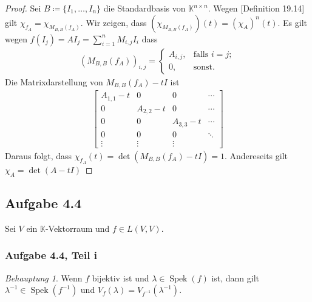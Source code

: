 \documentclass[draft,a5paper]{article}
\theoremstyle{remark}
\newtheorem*{beh}{Behauptung}
\DeclareMathOperator{\Spek}{Spek}
\begin{document}
\begin{proof}
  Sei \(B \coloneq \{I_{1}, \ldots, I_{n}\}\) die Standardbasis von
  \(\mathbb{K}^{n \times n}\).  Wegen [Definition 19.14] gilt
  \(\chi_{f_{A}} = \chi_{M_{B,B}(f_{A})}\).  Wir zeigen, dass
  \((\chi_{M_{B,B}(f_{A})})(t) = (\chi_{A})^{n}(t)\).  Es gilt wegen
  \(f(I_{j}) = AI_{j} = \sum_{i = 1}^{n}{M_{i,j}I_{i}}\) dass
  \begin{align*}
    (M_{B,B}(f_{A}))_{i, j} =
    \begin{cases}
      A_{i, j}, & \text{falls } i=j; \\
      0, & \text{sonst.}
    \end{cases}
  \end{align*}
  Die Matrixdarstellung von \(M_{B,B}(f_{A}) - tI\) ist
  \begin{align*}
    \begin{bmatrix}
      A_{1,1} - t & 0 & 0 & \cdots \\
      0 & A_{2,2} - t & 0 & \cdots \\
      0 & 0 & A_{3,3} - t & \cdots \\
      0 & 0 & 0 & \ddots \\
      \vdots & \vdots & \vdots
    \end{bmatrix}
  \end{align*}
  Daraus folgt, dass \(\chi_{f_{A}}(t) = \det(M_{B,B}(f_{A}) - tI) =
  1\).  Andereseits gilt \(\chi_{A} = \det(A - tI)\)
\end{proof}

\subsection*{Aufgabe 4.4}

Sei \(V\) ein \(\mathbb{K}\)-Vektorraum und \(f \in L(V, V)\).

\subsubsection*{Aufgabe 4.4, Teil i}

\begin{beh}
  Wenn \(f\) bijektiv ist und \(\lambda \in \Spek(f)\) ist, dann gilt \(\lambda^{-1}
  \in \Spek(f^{-1})\) und \(V_{f}(\lambda) = V_{f^{-1}}(\lambda^{-1})\).
\end{beh}
\end{document}
